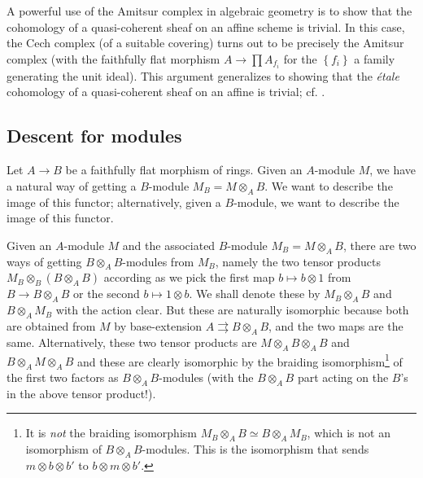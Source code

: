 \begin{remark} 
A powerful use of the Amitsur complex in algebraic geometry is to show that
the cohomology of a quasi-coherent sheaf on an affine scheme is trivial. In
this case, the Cech complex (of a suitable covering) turns out to be precisely
the Amitsur complex (with the faithfully flat morphism $A \to \prod A_{f_i}$
for the $\left\{f_i\right\}$ a family generating the unit ideal). This
argument generalizes to showing that the \emph{{\'e}tale}
cohomology of a quasi-coherent sheaf on an affine is trivial; cf. \cite{Ta94}.
\end{remark} 

\subsection{Descent for modules}
Let $A \to B$ be a faithfully flat morphism of rings.
Given an $A$-module $M$, we have a natural way of getting a $B$-module $M_B = M
\otimes_A B$. We want to describe the image of this functor; alternatively,
given a $B$-module, we want to describe the image of this functor. 

Given an $A$-module $M$ and the associated $B$-module $M_B = M \otimes_A B$,
there are two ways of getting $B \otimes_A B$-modules from $M_B$, namely 
the two tensor products $M_B \otimes_B (B \otimes_A B)$ according as we pick
the first map $b \mapsto b \otimes 1$ from $B \to B \otimes_A B$ or the
second $b \mapsto 1 \otimes b$.
We shall denote these by $M_B \otimes_A B$ and $B \otimes_A M_B$ with the
action clear.
But these are naturally isomorphic because both are obtained from $M$ by
base-extension $A \rightrightarrows B \otimes_A B$, and the two maps are the
same. Alternatively, these two tensor products are 
$M \otimes_A B \otimes_A B$ and $B \otimes_A M \otimes_A B$ and these are
clearly isomorphic by the braiding isomorphism\footnote{It is \emph{not} the
braiding isomorphism $M_B \otimes_A B \simeq B \otimes_A M_B$, which is not an
isomorphism of $B \otimes_A B$-modules.
This is the isomorphism that sends $m \otimes b \otimes b'$ to $b \otimes m
\otimes b'$.
} of the first two factors as $B \otimes_A B$-modules (with the $B \otimes_A B$ part
acting on the $B$'s in the above tensor product!).

